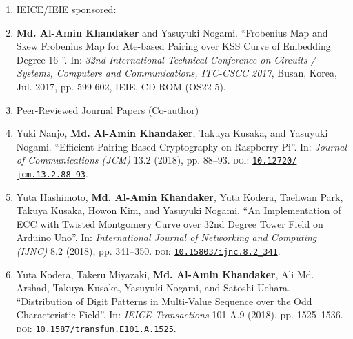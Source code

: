 \documentclass{article}[paper=a4,10pt]
\begin{document}
\begin{enumerate}
	\vspace{5mm}
	\item[ ] \Large IEICE/IEIE sponsored:
	\normalsize
	\item \textbf{Md. Al-Amin Khandaker} and Yasuyuki Nogami. ``Frobenius Map and Skew Frobenius Map for Ate-based Pairing over KSS Curve of Embedding Degree 16 ''. In: \textit{32nd International Technical Conference on Circuits / Systems, Computers and Communications, ITC-CSCC 2017},  Busan, Korea, Jul. 2017, pp. 599-602, IEIE, CD-ROM (OS22-5).
	
	
	\vspace{10mm}
	\clearpage
	\Large
	\item[] Peer-Reviewed Journal Papers  (Co-author)
	\normalsize
	
	\normalsize
	\item Yuki Nanjo, \textbf{Md. Al-Amin Khandaker}, Takuya Kusaka, and Yasuyuki Nogami. “Efficient Pairing-Based Cryptography on Raspberry Pi”. In: \textit{Journal of Communications (JCM)} 13.2 (2018), pp. 88–93. \textsc{doi}: \href{https://doi.org/10.12720/jcm.13.2.88-93}{\texttt{10.12720/\\jcm.13.2.88-93}}.
	
	\normalsize
	\item Yuta Hashimoto, \textbf{Md. Al-Amin Khandaker}, Yuta Kodera, Taehwan Park, Takuya Kusaka, Howon Kim, and Yasuyuki Nogami. ``An Implementation of ECC with Twisted Montgomery Curve over 32nd Degree Tower Field on Arduino Uno''. In: \textit{International Journal of Networking and Computing (IJNC)} 8.2 (2018), pp. 341–350. \textsc{doi}: \href{https://doi.org/10.15803/ijnc.8.2_341}{\texttt{10.15803/ijnc.8.2\_341}}.
	
	\normalsize
	\item Yuta Kodera, Takeru Miyazaki, \textbf{Md. Al-Amin Khandaker}, Ali Md. Arshad, Takuya Kusaka, Yasuyuki Nogami, and Satoshi Uehara. ``Distribution of Digit Patterns in Multi-Value Sequence over the Odd Characteristic Field''. In: \textit{IEICE Transactions} 101-A.9 (2018), pp. 1525–1536. \textsc{doi}: \href{https://doi.org/10.1587/transfun.E101.A.1525}{\texttt{10.1587/transfun.E101.A.1525}}.
	

\end{enumerate}
\end{document}
